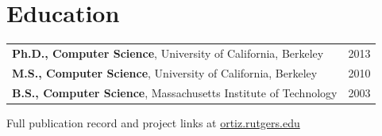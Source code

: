 \documentclass[10pt,letterpaper]{article}
\begin{document}
\section{Education}
\begin{tabularx}{\textwidth}{@{}Xr@{}}
\textbf{Ph.D., Computer Science}, University of California, Berkeley & 2013\\
\textbf{M.S., Computer Science}, University of California, Berkeley & 2010\\
\textbf{B.S., Computer Science}, Massachusetts Institute of Technology & 2003
\end{tabularx}

\vfill
\begin{center}
\footnotesize\color{muted}
Full publication record and project links at \href{https://ortiz.rutgers.edu}{ortiz.rutgers.edu}
\end{center}
\end{document}
